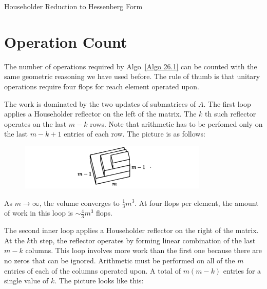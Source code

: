 \begin{algorithm}[H]
    \caption{Householder Reduction to Hessenberg Form}
    \label{Algo 26.1}
\end{algorithm}


\section{Operation Count}
The number of operations required by Algo~\ref{Algo 26.1} can be counted with the same geometric reasoning we have used before. The rule of thumb is that unitary operations require four flops for reach element operated upon. 

The work is dominated by the two updates of submatrices of $A$. The first loop applies a Householder reflector on the left of the matrix. The $k$ th such reflector operates on the last $m-k$ rows. Note that arithmetic has to be perfomed only on the last $m-k+1$ entries of each row. The picture is as follows: 
\begin{figure}[H]
    \centering
    \includegraphics[width=0.8\textwidth]{figures/26-6.png}
\end{figure}
As $m\to \infty$, the volume converges to $ \frac{1}{3}m^3 $. At four flops per element, the amount of work in this loop is $\sim \frac{4}{3}m^3$ flops. 

The second inner loop applies a Householder reflector on the right of the matrix. At the $k$th step, the reflector operates by forming linear combination of the last $m-k$ columns. This loop involves more work than the first one because there are no zeros that can be ignored. Arithmetic must be performed on all of the $m$ entries of each of the columns operated upon. A total of $m(m-k)$ entries for a single value of $k$. The picture looks like this: 

